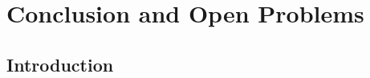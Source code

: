 \chapter{Conclusion and Open Problems}
\label{chap:conclusion}

\ifpdf
    \graphicspath{{Chapter8/Figs/Raster/}{Chapter8/Figs/PDF/}{Chapter8/Figs/}}
\else
    \graphicspath{{Chapter8/Figs/Vector/}{Chapter8/Figs/}}
\fi


\section{Introduction}


